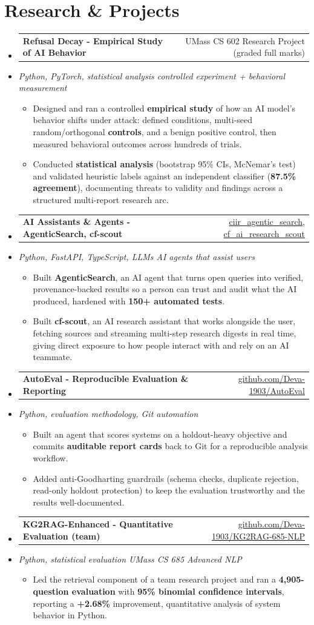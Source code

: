 \documentclass[letterpaper,10pt]{article}
\makeatletter
\newcommand{\resumeItem}[1]{
  \item\small{#1\vspace{-1pt}}
}
\newcommand{\resumeProjectHeading}[2]{
    \item
    \begin{tabular*}{0.985\textwidth}[t]{l@{\extracolsep{\fill}}r}
      \small\textbf{#1} & \small #2 \\
    \end{tabular*}\vspace{-5pt}
}
\newcommand{\resumeProjectSubheading}[1]{
  \vspace{-2pt}\item[] {\small\textcolor{ResumeSlate}{\emph{#1}}}\vspace{-3pt}
}
\newcommand{\resumeSubHeadingListStart}{\begin{itemize}[leftmargin=0.0in, label={}, itemsep=2pt, topsep=2pt]}
\newcommand{\resumeSubHeadingListEnd}{\end{itemize}}
\newcommand{\resumeItemListStart}{\begin{itemize}[leftmargin=0.18in, itemsep=2pt, topsep=1pt]}
\newcommand{\resumeItemListEnd}{\end{itemize}\vspace{-4pt}}
\makeatother
\begin{document}
\section{Research \& Projects}
\resumeSubHeadingListStart
  \resumeProjectHeading
    {Refusal Decay - Empirical Study of AI Behavior}
    {UMass CS 602 Research Project (graded full marks)}
  \resumeProjectSubheading{Python, PyTorch, statistical analysis \enspace\textbar\enspace controlled experiment + behavioral measurement}
    \resumeItemListStart
      \resumeItem{Designed and ran a controlled \textbf{empirical study} of how an AI model's behavior shifts under attack: defined conditions, multi-seed random/orthogonal \textbf{controls}, and a benign positive control, then measured behavioral outcomes across hundreds of trials.}
      \resumeItem{Conducted \textbf{statistical analysis} (bootstrap 95\% CIs, McNemar's test) and validated heuristic labels against an independent classifier (\textbf{87.5\% agreement}), documenting threats to validity and findings across a structured multi-report research arc.}
    \resumeItemListEnd
  \resumeProjectHeading
    {AI Assistants \& Agents - AgenticSearch, cf-scout}
    {\href{https://github.com/Deva-1903/ciir_agentic_search}{ciir\_agentic\_search}, \href{https://github.com/Deva-1903/cf_ai_research_scout}{cf\_ai\_research\_scout}}
  \resumeProjectSubheading{Python, FastAPI, TypeScript, LLMs \enspace\textbar\enspace AI agents that assist users}
    \resumeItemListStart
      \resumeItem{Built \textbf{AgenticSearch}, an AI agent that turns open queries into verified, provenance-backed results so a person can trust and audit what the AI produced, hardened with \textbf{150+ automated tests}.}
      \resumeItem{Built \textbf{cf-scout}, an AI research assistant that works alongside the user, fetching sources and streaming multi-step research digests in real time, giving direct exposure to how people interact with and rely on an AI teammate.}
    \resumeItemListEnd
  \resumeProjectHeading
    {AutoEval - Reproducible Evaluation \& Reporting}
    {\href{https://github.com/Deva-1903/AutoEval}{github.com/Deva-1903/AutoEval}}
  \resumeProjectSubheading{Python, evaluation methodology, Git automation}
    \resumeItemListStart
      \resumeItem{Built an agent that scores systems on a holdout-heavy objective and commits \textbf{auditable report cards} back to Git for a reproducible analysis workflow.}
      \resumeItem{Added anti-Goodharting guardrails (schema checks, duplicate rejection, read-only holdout protection) to keep the evaluation trustworthy and the results well-documented.}
    \resumeItemListEnd
  \resumeProjectHeading
    {KG2RAG-Enhanced - Quantitative Evaluation (team)}
    {\href{https://github.com/Deva-1903/KG2RAG-685-NLP}{github.com/Deva-1903/KG2RAG-685-NLP}}
  \resumeProjectSubheading{Python, statistical evaluation \enspace\textbar\enspace UMass CS 685 Advanced NLP}
    \resumeItemListStart
      \resumeItem{Led the retrieval component of a team research project and ran a \textbf{4,905-question evaluation} with \textbf{95\% binomial confidence intervals}, reporting a \textbf{+2.68\%} improvement, quantitative analysis of system behavior in Python.}
    \resumeItemListEnd
\resumeSubHeadingListEnd
\vspace{-4pt}
\end{document}
